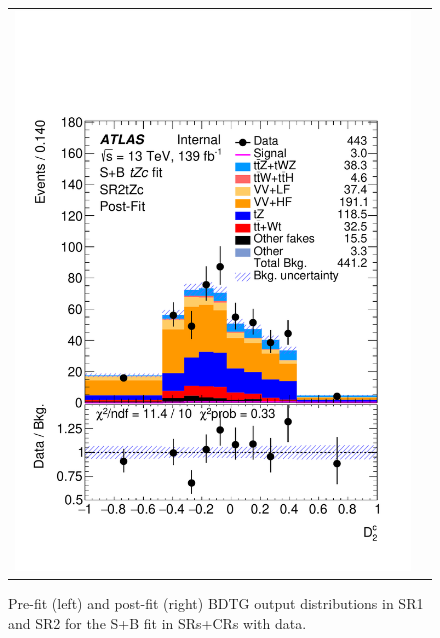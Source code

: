 \begin{figure}[htbp]
\begin{tabular}{cc}
		\includegraphics[width=.45\textwidth]{Chapters/CH8/figures/SPLUSB_CRSR_DL1rc_unblind/Plots/SR2_postFit} \\
	\end{tabular}
	\caption{Pre-fit (left) and post-fit (right) BDTG output distributions in SR1 and SR2 for the S+B \tZc fit in SRs+CRs with data.
		\ErrStatSys
	}%
	\label{fig:stat:tzc:splusb:crsr:srplots:1_unb}
\end{figure}

